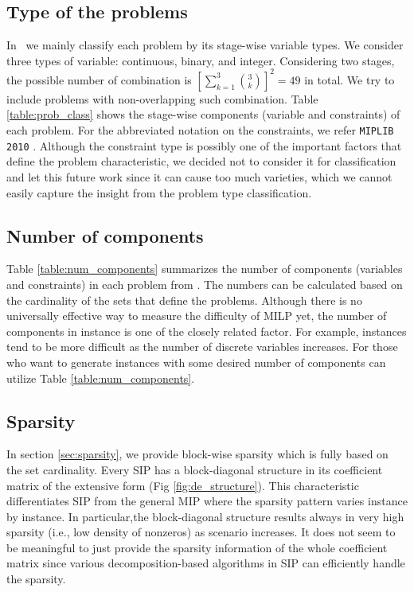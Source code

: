 \subsection{Type of the problems}
In \siplibtwo\, we mainly classify each problem by its stage-wise variable types. We consider three types of variable: continuous, binary, and integer. Considering two stages, the possible number of combination is $\left[\sum_{k=1}^3\binom{3}{k}\right]^2=49$ in total. We try to include problems with non-overlapping such combination. Table \ref{table:prob_class} shows the stage-wise components (variable and constraints) of each problem. For the abbreviated notation on the constraints, we refer \texttt{MIPLIB 2010} \cite{MIPLIB}. Although the constraint type is possibly one of the important factors that define the problem characteristic, we decided not to consider it for classification and let this future work since it can cause too much varieties, which we cannot easily capture the insight from the problem type classification. 


\subsection{Number of components}
Table \ref{table:num_components} summarizes the number of components (variables and constraints) in each problem from \siplibtwo. The numbers can be calculated based on the cardinality of the sets that define the problems. Although there is no universally effective way to measure the difficulty of MILP yet, the number of components in instance is one of the closely related factor. For example, instances tend to be more difficult as the number of discrete variables increases. For those who want to generate instances with some desired number of components can utilize Table \ref{table:num_components}.



\subsection{Sparsity}
In section \ref{sec:sparsity}, we provide block-wise sparsity which is fully based on the set cardinality. Every SIP has a block-diagonal structure in its coefficient matrix of the extensive form (Fig \ref{fig:de_structure}). This characteristic differentiates SIP from the general MIP where the sparsity pattern varies instance by instance. In particular,the block-diagonal structure results always in very high sparsity (i.e., low density of nonzeros) as scenario increases. It does not seem to be meaningful to just provide the sparsity information of the whole coefficient matrix since various decomposition-based algorithms in SIP can efficiently handle the sparsity. 

